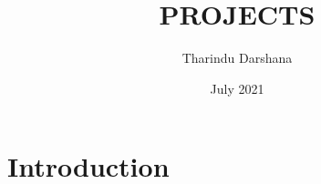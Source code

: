\documentclass{article}
\title{PROJECTS}
\author{Tharindu Darshana}
\date{July 2021}
\begin{document}
\maketitle

\section{Introduction}
\end{document}
